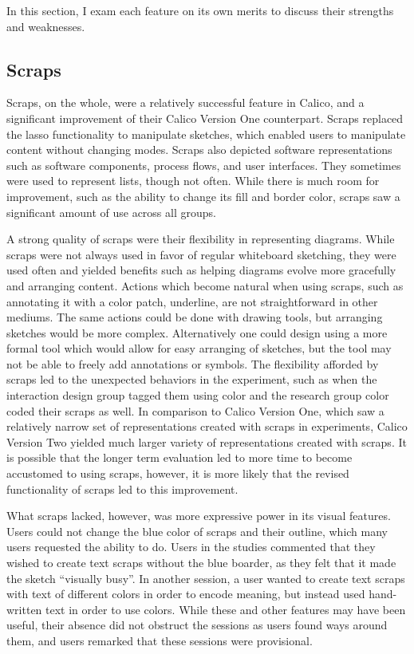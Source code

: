 \documentclass[12pt,fleqn]{ucithesis}
\begin{document}
In this section, I exam each feature on its own merits to discuss their strengths and weaknesses.

\subsection{Scraps}
Scraps, on the whole, were a relatively successful feature in Calico, and a significant improvement of their Calico Version One counterpart. Scraps replaced the lasso functionality to manipulate sketches, which enabled users to manipulate content without changing modes. Scraps also depicted software representations such as software components, process flows, and user interfaces. They sometimes were used to represent lists, though not often. While there is much room for improvement, such as the ability to change its fill and border color, scraps saw a significant amount of use across all groups. 

A strong quality of scraps were their flexibility in representing diagrams. While scraps were not always used in favor of regular whiteboard sketching, they were used often and yielded benefits such as helping diagrams evolve more gracefully and arranging content. Actions which become natural when using scraps, such as annotating it with a color patch, underline, are not straightforward in other mediums. The same actions could be done with drawing tools, but arranging sketches would be more complex. Alternatively one could design using a more formal tool which would allow for easy arranging of sketches, but the tool may not be able to freely add annotations or symbols. The flexibility afforded by scraps led to the unexpected behaviors in the experiment, such as when the interaction design group tagged them using color and the research group color coded their scraps as well. In comparison to Calico Version One, which saw a relatively narrow set of representations created with scraps in experiments, Calico Version Two yielded much larger variety of representations created with scraps. It is possible that the longer term evaluation led to more time to become accustomed to using scraps, however, it is more likely that the revised functionality of scraps led to this improvement.

What scraps lacked, however, was more expressive power in its visual features. Users could not change the blue color of scraps and their outline, which many users requested the ability to do. Users in the studies commented that they wished to create text scraps without the blue boarder, as they felt that it made the sketch ``visually busy''. In another session, a user wanted to create text scraps with text of different colors in order to encode meaning, but instead used hand-written text in order to use colors. While these and other features may have been useful, their absence did not obstruct the sessions as users found ways around them, and users remarked that these sessions were provisional.
\end{document}
